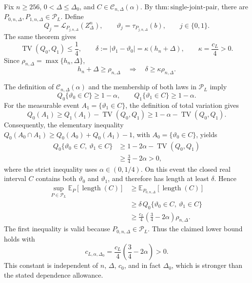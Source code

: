 Fix \(n\geq256\), \(0<\Delta\leq\Delta_0\), and \(C\in\mathcal C_{n,\Delta}(\alpha)\).  By \(\mathrm{thm:single\text{-}joint\text{-}pair}\), there are \(P_{0,n,\Delta},P_{1,n,\Delta}\in\mathcal P_L\).  Define
\[
 Q_j=\mathcal L_{P_{j,n,\Delta}}(Z_\Delta^n),
 \qquad
 \vartheta_j=\tau_{P_{j,n,\Delta}}(b),
 \qquad j\in\{0,1\}.
\]
The same theorem gives
\[
 \operatorname{TV}(Q_0,Q_1)\leq\frac14,
 \qquad
 \delta:=|\vartheta_1-\vartheta_0|
 =\kappa(h_n+\Delta),
 \qquad
 \kappa=\frac{c_L}{4}>0.
\]
Since \(\rho_{n,\Delta}=\max\{h_n,\Delta\}\),
\[
 h_n+\Delta\geq\rho_{n,\Delta}
 \quad\Longrightarrow\quad
 \delta\geq\kappa\rho_{n,\Delta}.
\]

The definition of \(\mathcal C_{n,\Delta}(\alpha)\) and the membership of both laws in \(\mathcal P_L\) imply
\[
 Q_0\{\vartheta_0\in C\}\geq1-\alpha,
 \qquad
 Q_1\{\vartheta_1\in C\}\geq1-\alpha.
\]
For the measurable event \(A_1=\{\vartheta_1\in C\}\), the definition of total variation gives
\[
 Q_0(A_1)
 \geq Q_1(A_1)-\operatorname{TV}(Q_0,Q_1)
 \geq1-\alpha-\operatorname{TV}(Q_0,Q_1).
\]
Consequently, the elementary inequality \(Q_0(A_0\cap A_1)\geq Q_0(A_0)+Q_0(A_1)-1\), with \(A_0=\{\vartheta_0\in C\}\), yields
\[
 \begin{aligned}
 Q_0\{\vartheta_0\in C,\ \vartheta_1\in C\}
 &\geq1-2\alpha-\operatorname{TV}(Q_0,Q_1)\\
 &\geq\frac34-2\alpha>0,
 \end{aligned}
\]
where the strict inequality uses \(\alpha\in(0,1/4)\).  On this event the closed real interval \(C\) contains both \(\vartheta_0\) and \(\vartheta_1\), and therefore has length at least \(\delta\).  Hence
\[
 \begin{aligned}
 \sup_{P\in\mathcal P_L}\mathbb E_P[\operatorname{length}(C)]
 &\geq\mathbb E_{P_{0,n,\Delta}}[\operatorname{length}(C)]\\
 &\geq\delta\,Q_0\{\vartheta_0\in C,\ \vartheta_1\in C\}\\
 &\geq\frac{c_L}{4}\left(\frac34-2\alpha\right)\rho_{n,\Delta}.
 \end{aligned}
\]
The first inequality is valid because \(P_{0,n,\Delta}\in\mathcal P_L\).  Thus the claimed lower bound holds with
\[
 c_{L,\alpha,\Delta_0}
 =\frac{c_L}{4}\left(\frac34-2\alpha\right)>0.
\]
This constant is independent of \(n\), \(\Delta\), \(c_0\), and in fact \(\Delta_0\), which is stronger than the stated dependence allowance.


